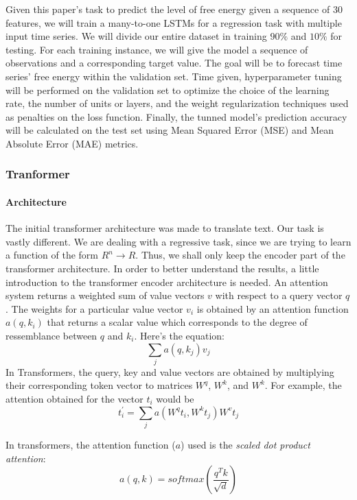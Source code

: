 \documentclass[11pt]{article}
\begin{document}
Given this paper's task to predict the level of free energy given a sequence of 30 features, we will train a many-to-one LSTMs for a regression task with multiple input time series. We will divide our entire dataset in training $90\%$ and $10\%$ for testing. For each training instance, we will give the model a sequence of observations and a corresponding target value. The goal will be to forecast time series' free energy within the validation set. Time given, hyperparameter tuning will be performed on the validation set to optimize the choice of the learning rate, the number of units or layers, and the weight regularization techniques used as penalties on the loss function. Finally, the tunned model's prediction accuracy will be calculated on the test set using Mean Squared Error (MSE) and Mean Absolute Error (MAE) metrics. 


\subsubsection{Tranformer}
\paragraph{Architecture}
The initial transformer architecture\cite{transformers} was made to translate text. Our task is vastly different. We are dealing with a regressive task, since we are trying to learn a function of the form $R^n \to R$. Thus, we shall only keep the encoder part of the transformer architecture. In order to better understand the results, a little introduction to the transformer encoder architecture is needed. 
An attention system returns a weighted sum of value vectors $v$ with respect to a query vector $q$. The weights for a particular value vector $v_i$ is obtained by an attention function $a(q, k_i)$ that returns a scalar value which corresponds to the degree of ressemblance between $q$ and $k_i$. Here's the equation:
\begin{equation}
    \sum_{j} a(q, k_j) v_j
\end{equation}
In Transformers, the query, key and value vectors are obtained by multiplying their corresponding token vector to matrices $W^q$, $W^k$, and $W^k$. For example, the attention obtained for the vector $t_i$ would be
\begin{equation}
        t_{i}^{'} = \sum_{j} a(W^{q}t_{i}, W^{k}t_j) W^{v}t_j
\end{equation}

In transformers, the attention function ($a$) used is the {\it scaled dot product attention}:
    \[ a(q, k) = softmax( \frac{q^Tk}{\sqrt{d}}) \]
\end{document}
